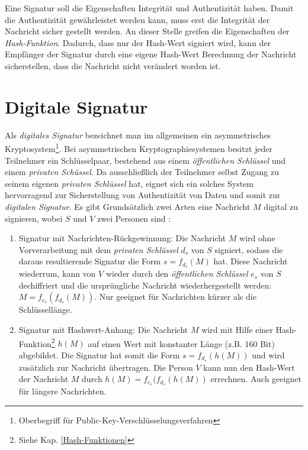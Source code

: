 \documentclass[11pt,a4paper,ngerman]{report}
\begin{document}
Eine Signatur soll die Eigenschaften Integrität und Authentizität haben. Damit die Authentizität gewährleistet werden kann, muss erst die Integrität der Nachricht sicher gestellt werden. An dieser Stelle greifen die Eigenschaften der \textit{Hash-Funktion}. Dadurch, dass nur der Hash-Wert signiert wird, kann der Empfänger der Signatur durch eine eigene Hash-Wert Berechnung der Nachricht sicherstellen, dass die Nachricht nicht verändert worden ist.

\section{Digitale Signatur}
Als \textit{digitales Signatur} bezeichnet man im allgemeinen ein asymmetrisches Kryptosystem\footnote{Oberbegriff für Public-Key-Verschlüsselungsverfahren}. Bei asymmetrischen Kryptographiesystemen besitzt jeder Teilnehmer ein Schlüsselpaar, bestehend aus einem \textit{öffentlichen Schlüssel} und einem \textit{privaten Schüssel}. Da ausschließlich der Teilnehmer selbst Zugang zu seinem eigenen \textit{privaten Schlüssel} hat, eignet sich ein solches System hervorragend zur Sicherstellung von Authentizität von Daten und somit zur \textit{digitalen Signatur}. Es gibt Grundsätzlich zwei Arten eine Nachricht $M$ digital zu signieren, wobei $S$ und $V$ zwei Personen sind \cite[S. 28-29]{kryptSec11}:
\begin{enumerate}
    \item Signatur mit Nachrichten-Rückgewinnung: Die Nachricht $M$ wird ohne Vorverarbeitung mit dem \textit{privaten Schlüssel} $d_s$ von $S$ signiert, sodass die daraus resultierende Signatur die Form $s=f_{d_s}(M)$ hat. Diese Nachricht wiederrum, kann von $V$ wieder durch den \textit{öffentlichen Schlüssel} $e_s$ von $S$ dechiffriert und die ursprüngliche Nachricht wiederhergestellt werden: $M=f_{e_s}(f_{d_s}(M))$. Nur geeignet für Nachrichten kürzer als die Schlüssellänge.
    \item Signatur mit Hashwert-Anhang: Die Nachricht $M$ wird mit Hilfe einer Hash-Funktion\footnote{Siehe Kap. \ref{Hash-Funktionen}} $h(M)$ auf einen Wert mit konstanter Länge (z.B. 160 Bit) abgebildet. Die Signatur hat somit die Form $s=f_{d_s}(h(M))$ und wird zusätzlich zur Nachricht übertragen. Die Person $V$ kann nun den Hash-Wert der Nachricht $M$ durch $h(M)=f_{e_s}(f_{d_s}(h(M))$ errechnen. Auch geeignet für längere Nachrichten.
\end{enumerate}


\end{document}
